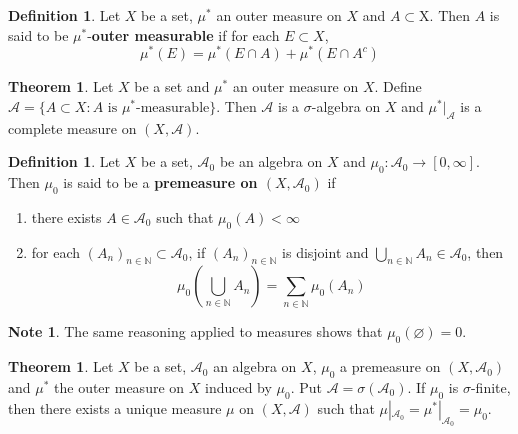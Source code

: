 \documentclass[12pt]{amsart}
\theoremstyle{definition}
\newtheorem{defn}[definition]{Definition}
\newtheorem{note}[definition]{Note}
\newtheorem{thm}[definition]{Theorem}
\newcommand{\sig}{\sigma}
\newcommand{\N}{\mathbb{N}}
\newcommand{\MA}{\mathcal{A}}
\begin{document}
	\begin{defn}
		Let $X$ be a set, $\mu^*$ an outer measure on $X$ and $A \subset $X. Then $A$ is said to be $\mu^*$-\textbf{outer measurable} if for each $E \subset X$, $$\mu^*(E) = \mu^*(E \cap A) + \mu^*(E \cap A^c)$$ 
	\end{defn}
	
	\begin{thm}
		Let $X$ be a set and $\mu^*$ an outer measure on $X$. Define $\MA = \{A \subset X: A \text{ is }\mu^*\text{-measurable}\}$. Then $\MA$ is a $\sig$-algebra on $X$ and $\mu^*|_{\MA}$ is a complete measure on $(X, \MA)$.
	\end{thm}
	
	\begin{defn}
		Let $X$ be a set, $\MA_0$ be an algebra on $X$ and $\mu_0:\MA_0 \rightarrow [0, \infty]$. Then $\mu_0$ is said to be a \textbf{premeasure on $(X,\MA_0)$} if 
		\begin{enumerate}
			\item there exists $A \in \MA_0$ such that $\mu_0(A)< \infty$
			\item for each $(A_n)_{n \in \N} \subset \MA_0$, if $(A_n)_{n \in \N}$ is disjoint and $\bigcup\limits_{n \in \N}A_n \in \MA_0$, then $$\mu_0(\bigcup_{n\in \N}A_n) = \sum_{n \in \N}\mu_0(A_n)$$
		\end{enumerate}
	\end{defn}
	
	\begin{note}
		The same reasoning applied to measures shows that $\mu_0(\varnothing) = 0$.
	\end{note}
	
	\begin{thm}
		Let $X$ be a set, $\MA_0$ an algebra on $X$, $\mu_0$ a premeasure on $(X,\MA_0)$ and $\mu^*$ the outer measure on $X$ induced by $\mu_0$. Put $\MA = \sig(\MA_0)$. If $\mu_0$ is $\sig$-finite, then there exists a unique measure $\mu$ on $(X, \MA)$ such that $\mu|_{\MA_0} = \mu^*|_{\MA_0} = \mu_0$. 
	\end{thm}
	
	
	
	
	
	
	
	
	
	
	
	
	
	
	
	
	
	
	
	
	
\end{document}
